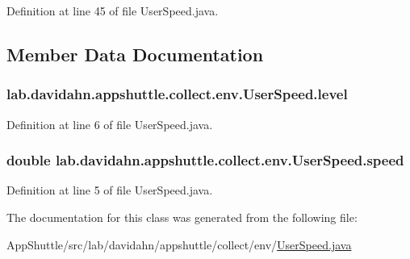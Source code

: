 \-Definition at line 45 of file \-User\-Speed.\-java.



\subsection{\-Member \-Data \-Documentation}
\hypertarget{classlab_1_1davidahn_1_1appshuttle_1_1collect_1_1env_1_1_user_speed_a867afee6398c3a0b5b7a938061878b1d}{
\subsubsection[{level}]{ {\bf lab.\-davidahn.\-appshuttle.\-collect.\-env.\-User\-Speed.\-level}}}\label{classlab_1_1davidahn_1_1appshuttle_1_1collect_1_1env_1_1_user_speed_a867afee6398c3a0b5b7a938061878b1d}


\-Definition at line 6 of file \-User\-Speed.\-java.

\hypertarget{classlab_1_1davidahn_1_1appshuttle_1_1collect_1_1env_1_1_user_speed_a94e3e0a8a429b8ac1081ddb024d583ca}{
\subsubsection[{speed}]{\setlength{\rightskip}{0pt plus 5cm}double {\bf lab.\-davidahn.\-appshuttle.\-collect.\-env.\-User\-Speed.\-speed}}}\label{classlab_1_1davidahn_1_1appshuttle_1_1collect_1_1env_1_1_user_speed_a94e3e0a8a429b8ac1081ddb024d583ca}


\-Definition at line 5 of file \-User\-Speed.\-java.



\-The documentation for this class was generated from the following file\-:\begin{DoxyCompactItemize}
\item 
\-App\-Shuttle/src/lab/davidahn/appshuttle/collect/env/\hyperlink{_user_speed_8java}{\-User\-Speed.\-java}\end{DoxyCompactItemize}
